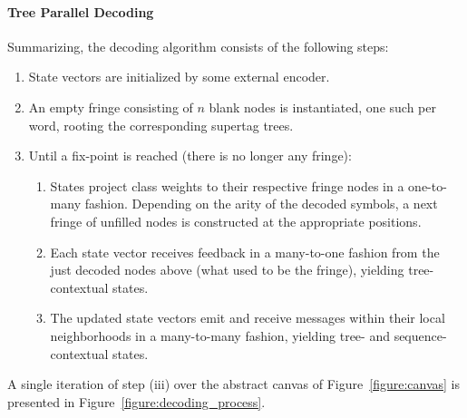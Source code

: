 \paragraph{Tree Parallel Decoding}
Summarizing, the decoding algorithm consists of the following steps:
\begin{enumerate}
	\item State vectors are initialized by some external encoder.
	\item An empty fringe consisting of $n$ blank nodes is instantiated, one such per word, rooting the corresponding supertag trees.
	\item Until a fix-point is reached (there is no longer any fringe):
		\begin{enumerate}
			\item States project class weights to their respective fringe nodes in a one-to-many fashion. Depending on the arity of the decoded symbols, a next fringe of unfilled nodes is constructed at the appropriate positions.
			\item Each state vector receives feedback in a many-to-one fashion from the just decoded nodes above (what used to be the fringe), yielding tree-contextual states.
			\item The updated state vectors emit and receive messages within their local neighborhoods in a many-to-many fashion, yielding tree- and sequence- contextual states.
		\end{enumerate}
\end{enumerate}
A single iteration of step (iii) over the abstract canvas of Figure~\ref{figure:canvas} is presented in Figure~\ref{figure:decoding_process}.

